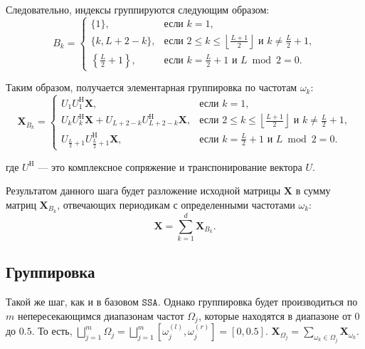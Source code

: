 \documentclass[12pt, specialist, subf
]{disser}
\theoremstyle{definition}
\newcommand{\SSA}{\texttt{SSA}}
\begin{document}
Следовательно, индексы группируются следующим образом:
\[
B_k = 
\begin{cases}
\{1\}, & \text{если } k = 1, \\
\{k, L + 2 - k\}, & \text{если } 2 \leq k \leq \left\lfloor \frac{L+1}{2} \right\rfloor \text{ и } k \ne \frac{L}{2} + 1, \\
\left\{ \frac{L}{2} + 1 \right\}, & \text{если } k = \frac{L}{2} + 1 \text{ и } L \bmod 2 = 0.
\end{cases}
\]


Таким образом, получается элементарная группировка по частотам $\omega_k$:
\[
\mathbf{X}_{B_k} = 
\begin{cases}
U_1 U_1^\mathrm{H} \mathbf{X}, & \text{если } k = 1, \\[5pt]
U_k U_k^\mathrm{H} \mathbf{X} + U_{L+2-k} U_{L+2-k}^\mathrm{H} \mathbf{X}, & \text{если } 2 \leq k \leq \left\lfloor \frac{L+1}{2} \right\rfloor \text{ и } k \ne \frac{L}{2} + 1, \\[5pt]
U_{\frac{L}{2} + 1} U_{\frac{L}{2} + 1}^\mathrm{H} \mathbf{X}, & \text{если } k = \frac{L}{2} + 1 \text{ и } L \bmod 2 = 0.
\end{cases}
\]

где $U^\mathrm{H}$ --- это комплексное сопряжение и транспонирование вектора $U$.

Результатом данного шага будет разложение исходной матрицы $\mathbf X$ в сумму матриц $\mathbf{X}_{B_k}$, отвечающих периодикам с определенными частотами $\omega_k$:
\begin{equation*}
	\mathbf X = \sum\limits_{k=1}^d \mathbf{X}_{B_k} .
\end{equation*}


\subsection*{Группировка}
Такой же шаг, как и в базовом $\SSA$. Однако группировка будет производиться по $m$ непересекающимся диапазонам частот $\Omega_j$, которые находятся в диапазоне от $0$ до $0.5$. То есть,
$\bigsqcup \limits_{j=1}^m \Omega_j =
			      \bigsqcup \limits_{j=1}^m
			      \left[ \omega_j^{(l)}, \omega_j^{(r)} \right] =
			      [0, 0.5]$. $\mathbf X_{\Omega_j} =\sum\limits_{\omega_k \in \Omega_j} \mathbf{X}_{\omega_k}$.
\end{document}

